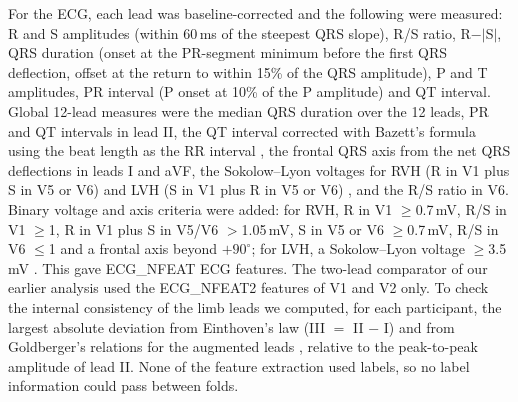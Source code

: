 \documentclass[11pt]{article}
\begin{document}
For the ECG, each lead was baseline-corrected and the following were measured: R and S amplitudes (within 60\,ms of the steepest QRS slope), R/S ratio, R$-|$S$|$, QRS duration (onset at the PR-segment minimum before the first QRS deflection, offset at the return to within 15\% of the QRS amplitude), P and T amplitudes, PR interval (P onset at 10\% of the P amplitude) and QT interval. Global 12-lead measures were the median QRS duration over the 12 leads, PR and QT intervals in lead II, the QT interval corrected with Bazett's formula using the beat length as the RR interval \cite{bazett1920analysis}, the frontal QRS axis from the net QRS deflections in leads I and aVF, the Sokolow--Lyon voltages for RVH (R in V1 plus S in V5 or V6) \cite{sokolow1949ventricular} and LVH (S in V1 plus R in V5 or V6) \cite{sokolow1949lvh}, and the R/S ratio in V6. Binary voltage and axis criteria were added: for RVH, R in V1 $\geq$0.7\,mV, R/S in V1 $\geq$1, R in V1 plus S in V5/V6 $>$1.05\,mV, S in V5 or V6 $\geq$0.7\,mV, R/S in V6 $\leq$1 and a frontal axis beyond $+90^{\circ}$; for LVH, a Sokolow--Lyon voltage $\geq$3.5\,mV \cite{hancock2009aha,kligfield2007recommendations}. This gave {{ECG_NFEAT}} ECG features. The two-lead comparator of our earlier analysis used the {{ECG_NFEAT2}} features of V1 and V2 only. To check the internal consistency of the limb leads we computed, for each participant, the largest absolute deviation from Einthoven's law (III $=$ II $-$ I) and from Goldberger's relations for the augmented leads \cite{goldberger1942simple}, relative to the peak-to-peak amplitude of lead II. None of the feature extraction used labels, so no label information could pass between folds.
\end{document}
